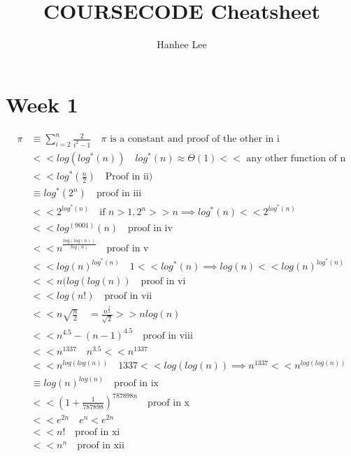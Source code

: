 \documentclass{article}
\title{COURSECODE Cheatsheet}
\author{Hanhee Lee}
\begin{document}
    \maketitle

    \tableofcontents

    \listoffigures

    \listoftables

    \section{Week 1}
    \begin{align*}
        \pi &\equiv \sum_{i=2}^n \frac{2}{i^2-1} \quad \pi \text{ is a constant and proof of the other in i} \\ 
        &<< log(log^*(n)) \quad log^*(n) \approx \Theta(1) << \text{ any other function of n} \\ 
        &<< log^*(\frac{n}{2}) \quad \text{Proof in ii)} \\ 
        &\equiv log^*(2^n) \quad \text{proof in iii} \\ 
        &<< 2^{log^*(n)} \quad \text{if } n > 1, 2^n >> n \implies log^*(n) << 2^{log^*(n)} \\ 
        &<<log^{(9001)}(n) \quad \text{proof in iv} \\
        &<<n^{\frac{log(log(n))}{log(n)}} \quad \text{proof in v} \\
        &<< log(n)^{log^*(n)} \quad 1<<log^*(n) \implies log(n) << log(n)^{log^*(n)} \\ 
        &<< n(log(log(n)) \quad \text{proof in vi} \\ 
        &<< log(n!) \quad \text{proof in vii} \\
        &<< n\sqrt{\frac{n}{2}} \quad = \frac{n^{\frac{3}{2}}}{\sqrt{2}} >> nlog(n) \\ 
        &<< n^{4.5} - (n-1)^{4.5} \quad \text{proof in viii} \\ 
        &<< n^{1337} \quad n^{3.5} << n^{1337} \\ 
        &<< n^{log(log(n))} \quad 1337 << log(log(n)) \implies n^{1337} << n^{log(log(n))} \\ 
        &\equiv log(n)^{log(n)} \quad \text{proof in ix} \\ 
        &<< (1+\frac{1}{787898})^{787898n} \quad \text{proof in x}\\
        &<< e^{2n} \quad e^n < e^{2n} \\ 
        &<< n! \quad \text{proof in xi} \\ 
        &<< n^n \quad \text{proof in xii}
    \end{align*}
\end{document}
